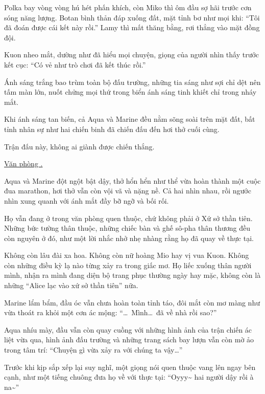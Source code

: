\documentclass[../main.tex]{subfiles}
\begin{document}
Polka bay vòng vòng hú hét phấn khích, còn Miko thì ôm đầu sợ hãi trước cơn sóng năng lượng. Botan bình thản đáp xuống đất, mặt tỉnh bơ như mọi khi: ``Tôi đã đoán được cái kết này rồi.'' Lamy thì mất thăng bằng, rơi thẳng vào mặt đồng đội.

Kuon nheo mắt, dường như đã hiểu mọi chuyện, giọng của người nhìn thấy trước kết cục: ``Có vẻ như trò chơi đã kết thúc rồi.''

Ánh sáng trắng bao trùm toàn bộ đấu trường, những tia sáng như sợi chỉ dệt nên tấm màn lớn, nuốt chửng mọi thứ trong biển ánh sáng tinh khiết chỉ trong nháy mắt.

Khi ánh sáng tan biến, cả Aqua và Marine đều nằm sõng soài trên mặt đất, bất tỉnh nhân sự như hai chiến binh đã chiến đấu đến hơi thở cuối cùng.

Trận đấu này, không ai giành được chiến thắng.

\ct

\begin{center}
  \uline{Văn phòng \hll.}
\end{center}

Aqua và Marine đột ngột bật dậy, thở hổn hển như thể vừa hoàn thành một cuộc đua marathon, hơi thở vẫn còn vội vã và nặng nề. Cả hai nhìn nhau, rồi ngước nhìn xung quanh với ánh mắt đầy bỡ ngỡ và bối rối.

Họ vẫn đang ở trong văn phòng quen thuộc, chứ không phải ở Xứ sở thần tiên. Những bức tường thân thuộc, những chiếc bàn và ghế sô-pha thân thương đều còn nguyên ở đó, như một lời nhắc nhở nhẹ nhàng rằng họ đã quay về thực tại.

Không còn lâu đài xa hoa. Không còn nữ hoàng Mio hay vị vua Kuon. Không còn những điều kỳ lạ nào từng xảy ra trong giấc mơ. Họ liếc xuống thân người mình, nhận ra mình đang diện bộ trang phục thường ngày hay mặc, không còn là những ``Alice lạc vào xứ sở thần tiên'' nữa.

Marine lẩm bẩm, đầu óc vẫn chưa hoàn toàn tỉnh táo, đôi mắt còn mơ màng như vừa thoát ra khỏi một cơn ác mộng: ``\dots\ Mình\dots\ đã về nhà rồi sao?''

Aqua nhíu mày, đầu vẫn còn quay cuồng với những hình ảnh của trận chiến ác liệt vừa qua, hình ảnh đấu trường và những trang sách bay lượn vẫn còn mờ ảo trong tâm trí: ``Chuyện gì vừa xảy ra với chúng ta vậy\dots''

Trước khi kịp sắp xếp lại suy nghĩ, một giọng nói quen thuộc vang lên ngay bên cạnh, như một tiếng chuông đưa họ về với thực tại: ``Oyyy\~{} hai người dậy rồi à na\~{}''
\end{document}
